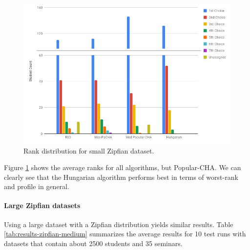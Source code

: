 \begin{figure}[h!]
  \centering
    \includegraphics[width=0.9\linewidth]{assets/plots/small-zipfian-cropped.png}
    \caption{Rank distribution for small Zipfian dataset.}
    \label{fig:zipfian-small-distribution}
\end{figure}

Figure \ref{fig:zipfian-small-distribution} shows the average ranks for all algorithms, but Popular-CHA. We can clearly see that the Hungarian algorithm performs best in terms of worst-rank and profile in general. 

\paragraph{Large Zipfian datasets}
Using a large dataset with a Zipfian distribution yields similar results. Table \ref{tab:results-zipfian-medium} summarizes the average results for 10 test runs with datasets that contain about 2500 students and 35 seminars.

